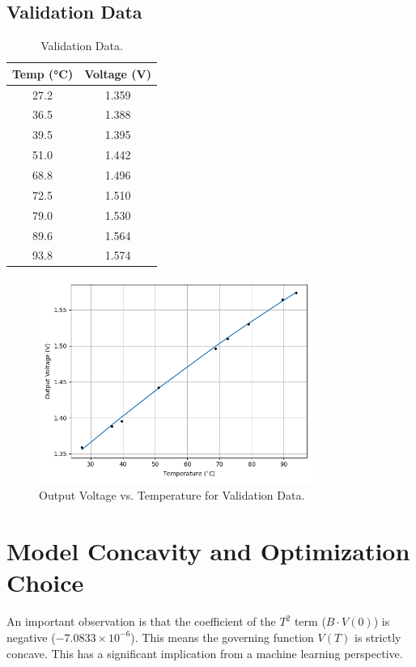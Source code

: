 \documentclass{article}
\begin{document}
	\subsection{Validation Data}
	\begin{table}[H]
		\centering
		\caption{Validation Data.}
		\label{tab:validationdata}
		\begin{tabular}{cc}
			\toprule
			\textbf{Temp (°C)} & \textbf{Voltage (V)} \\
			\midrule
			27.2 & 1.359 \\
			36.5 & 1.388 \\
			39.5 & 1.395 \\
			51.0 & 1.442 \\
			68.8 & 1.496 \\
			72.5 & 1.510 \\
			79.0 & 1.530 \\
			89.6 & 1.564 \\
			93.8 & 1.574 \\
			\bottomrule
		\end{tabular}
	\end{table}
	
\begin{figure}[H]
	\centering
	\includegraphics[width=0.8\textwidth]{figs/valid}
	\caption{Output Voltage vs. Temperature for Validation Data.}
	\label{fig:valid}
\end{figure}
	
	\section{Model Concavity and Optimization Choice}
	An important observation is that the coefficient of the \(T^2\) term (\(B \cdot V(0)\)) is negative ($-7.0833 \times 10^{-6}$). This means the governing function \(V(T)\) is strictly concave. This has a significant implication from a machine learning perspective.
	
\end{document}
